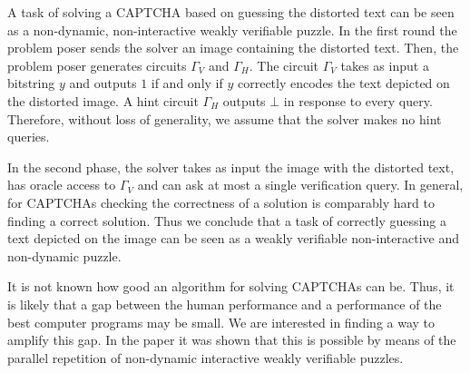 A task of solving a CAPTCHA based on guessing the distorted text can be seen as a non-dynamic,
non-interactive weakly verifiable puzzle.
In the first round the problem poser sends the solver an image containing the distorted text.
Then, the problem poser generates circuits $\Gamma_V$ and $\Gamma_H$.
The circuit $\Gamma_V$ takes as input a bitstring $y$ and outputs $1$
if and only if $y$ correctly encodes the text depicted on the distorted image.
A hint circuit $\Gamma_H$ outputs $\bot$ in response to every query.
Therefore, without loss of generality, we assume that the solver makes no hint queries.

In the second phase, the solver takes as input the image with the distorted text, has oracle access to $\Gamma_V$
and can ask at most a single verification query. In general, for CAPTCHAs checking the correctness of a solution is
comparably hard to finding a correct solution.
Thus we conclude that a task of correctly guessing a text depicted on the image can be seen as a weakly verifiable non-interactive and non-dynamic puzzle.

It is not known how good an algorithm for solving CAPTCHAs can be. Thus, it is likely that a gap between the human
performance and a performance of the best computer programs may be small. We are interested in finding a way to amplify this gap.
In the paper \cite{DBLP:journals/corr/abs-1002-3534} it was shown that this is possible by means of the parallel repetition of non-dynamic
interactive weakly verifiable puzzles.



